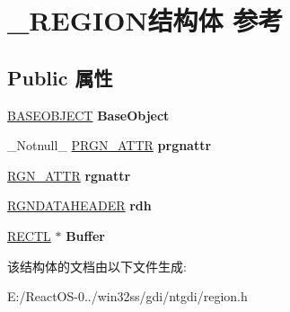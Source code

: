 \hypertarget{struct___r_e_g_i_o_n}{}\section{\+\_\+\+R\+E\+G\+I\+O\+N结构体 参考}
\label{struct___r_e_g_i_o_n}
\subsection*{Public 属性}
\begin{DoxyCompactItemize}
\item 
\mbox{\label{struct___r_e_g_i_o_n_a85e05c05b4331d97e8dff4e7a0e6a4fc}} 
\hyperlink{class_b_a_s_e_o_b_j_e_c_t}{B\+A\+S\+E\+O\+B\+J\+E\+CT} {\bfseries Base\+Object}
\item 
\mbox{\label{struct___r_e_g_i_o_n_a34c624d691b1116f2107ecd02345deaa}} 
\+\_\+\+Notnull\+\_\+ \hyperlink{struct___r_g_n___a_t_t_r}{P\+R\+G\+N\+\_\+\+A\+T\+TR} {\bfseries prgnattr}
\item 
\mbox{\label{struct___r_e_g_i_o_n_a1fc3d5c76c38b34456d566435ccd552f}} 
\hyperlink{struct___r_g_n___a_t_t_r}{R\+G\+N\+\_\+\+A\+T\+TR} {\bfseries rgnattr}
\item 
\mbox{\label{struct___r_e_g_i_o_n_a5a524b7eab1da1db8706e9e9d44332eb}} 
\hyperlink{struct___r_g_n_d_a_t_a_h_e_a_d_e_r}{R\+G\+N\+D\+A\+T\+A\+H\+E\+A\+D\+ER} {\bfseries rdh}
\item 
\mbox{\label{struct___r_e_g_i_o_n_a5832781910b3920b31cac65fb966a370}} 
\hyperlink{struct___r_e_c_t_l}{R\+E\+C\+TL} $\ast$ {\bfseries Buffer}
\end{DoxyCompactItemize}


该结构体的文档由以下文件生成\+:\begin{DoxyCompactItemize}
\item 
E\+:/\+React\+O\+S-\/0../win32ss/gdi/ntgdi/region.\+h\end{DoxyCompactItemize}

